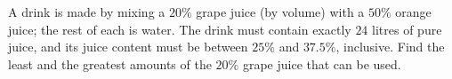 A drink is made by mixing a $20\%$ grape juice (by volume) with a $50\%$ orange juice; the rest of each is water. The drink must contain exactly $24$ litres of pure juice, and its juice content must be between $25\%$ and $37.5\%$, inclusive. Find the least and the greatest amounts of the $20\%$ grape juice that can be used.
